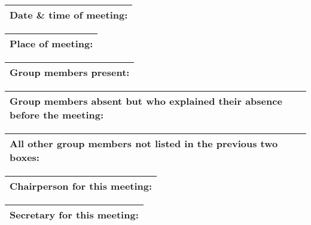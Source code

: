 \documentclass{article}
\begin{document}
\begin{table}[H]
	\centering
	\begin{tabular}{| p{12cm}  |}
	\hline
	Date \& time of meeting: \\ \hline
\end{tabular}
\end{table}

\begin{table}[H]
	\centering
	\begin{tabular}{| p{12cm}  |}
	\hline
	Place of meeting: \\ \hline
\end{tabular}
\end{table}

\begin{table}[H]
	\centering
	\begin{tabular}{| p{12cm}  |}
	\hline
	Group members present: \\ \hline
\end{tabular}
\end{table}

\begin{table}[H]
	\centering
	\begin{tabular}{| p{12cm}  |}
	\hline
	Group members absent but who explained their absence before the meeting: \\ \hline
\end{tabular}
\end{table}

\begin{table}[H]
	\centering
	\begin{tabular}{| p{12cm}  |}
	\hline
	All other group members not listed in the previous two boxes: \\ \hline
\end{tabular}
\end{table}

\begin{table}[H]
	\centering
	\begin{tabular}{| p{12cm}  |}
	\hline
	Chairperson for this meeting: \\ \hline
\end{tabular}
\end{table}

\begin{table}[H]
	\centering
	\begin{tabular}{| p{12cm}  |}
	\hline
	Secretary for this meeting:  \\ \hline
\end{tabular}
\end{table}
\end{document}
